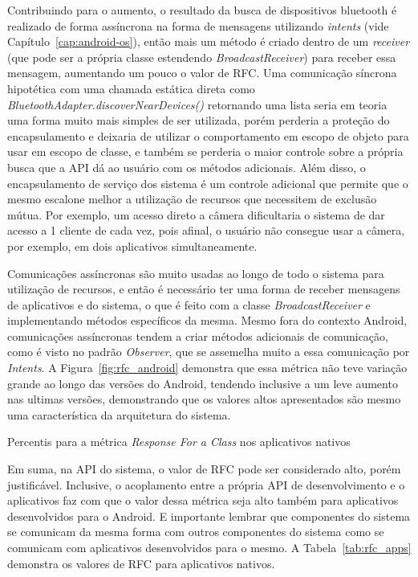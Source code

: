 Contribuindo para o aumento, o resultado da busca de dispositivos bluetooth é realizado de forma assíncrona na forma de mensagens utilizando \textit{intents} (vide Capítulo~\ref{cap:android-os}), então mais um método é criado dentro de um \textit{receiver} (que pode ser a própria classe estendendo \textit{BroadcastReceiver}) para receber essa mensagem, aumentando um pouco o valor de RFC. Uma comunicação síncrona hipotética com uma chamada estática direta como \textit{BluetoothAdapter.discoverNearDevices()} retornando uma lista seria em teoria uma forma muito mais simples de ser utilizada, porém perderia a proteção do encapsulamento e deixaria de utilizar o comportamento em escopo de objeto para usar em escopo de classe, e também se perderia o maior controle sobre a própria busca que a API dá ao usuário com os métodos adicionais. Além disso, o encapsulamento de serviço dos sistema é um controle adicional que permite que o mesmo escalone melhor a utilização de recursos que necessitem de exclusão mútua. Por exemplo, um acesso direto a câmera dificultaria o sistema de dar acesso a 1 cliente de cada vez, pois afinal, o usuário não consegue usar a câmera, por exemplo, em dois aplicativos simultaneamente.

Comunicações assíncronas são muito usadas ao longo de todo o sistema para utilização de recursos, e então é necessário ter uma forma de receber mensagens de aplicativos e do sistema, o que é feito com a classe \textit{BroadcastReceiver} e implementando métodos específicos da mesma. Mesmo fora do contexto Android, comunicações assíncronas tendem a criar métodos adicionais de comunicação, como é visto no padrão \textit{Observer}, que se assemelha muito a essa comunicação por \textit{Intents}. A Figura~\ref{fig:rfc_android} demonstra que essa métrica não teve variação grande ao longo das versões do Android, tendendo inclusive a um leve aumento nas ultimas versões, demonstrando que os valores altos apresentados são mesmo uma característica da arquitetura do sistema. 

\begin{table}[!htb]

\caption{Percentis para a métrica \textit{Response For a Class} nos aplicativos nativos}
\label{tab:rfc_apps}
\end{table}


Em suma, na API do sistema, o valor de RFC pode ser considerado alto, porém justificável. Inclusive, o acoplamento entre a própria API de desenvolvimento e o aplicativos faz com que o valor dessa métrica seja alto também para aplicativos desenvolvidos para o Android. E importante lembrar que componentes do sistema se comunicam da mesma forma com outros componentes do sistema como se comunicam com aplicativos desenvolvidos para o mesmo. A Tabela~\ref{tab:rfc_apps} demonstra os valores de RFC para aplicativos nativos.

